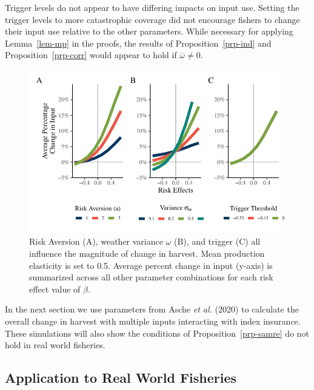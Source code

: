 \documentclass[
  letterpaper,
  DIV=11,
  numbers=noendperiod]{scrartcl}
\theoremstyle{plain}
\theoremstyle{plain}
\theoremstyle{remark}
\begin{document}
Trigger levels do not appear to have differing impacts on input use.
Setting the trigger levels to more catastrophic coverage did not
encourage fishers to change their input use relative to the other
parameters. While necessary for applying Lemma~\ref{lem-mp} in the
proofs, the results of Proposition~\ref{prp-ind} and
Proposition~\ref{prp-corr} would appear to hold if \(\bar\omega\ne0\).

\begin{figure}

{\centering \includegraphics{ibi-behavior_files/figure-pdf/fig-sum-1.pdf}

}

\caption{\label{fig-sum}Risk Aversion (A), weather variance \(\omega\)
(B), and trigger (C) all influence the magnitude of change in harvest.
Mean production elasticity is set to 0.5. Average percent change in
input (y-axis) is summarized across all other parameter combinations for
each risk effect value of \(\beta\).}

\end{figure}

In the next section we use parameters from Asche \emph{et al.} (2020) to
calculate the overall change in harvest with multiple inputs interacting
with index insurance. These simulations will also show the conditions of
Proposition~\ref{prp-samre} do not hold in real world fisheries.

\hypertarget{application-to-real-world-fisheries}{%
\subsection{Application to Real World
Fisheries}\label{application-to-real-world-fisheries}}
\end{document}
